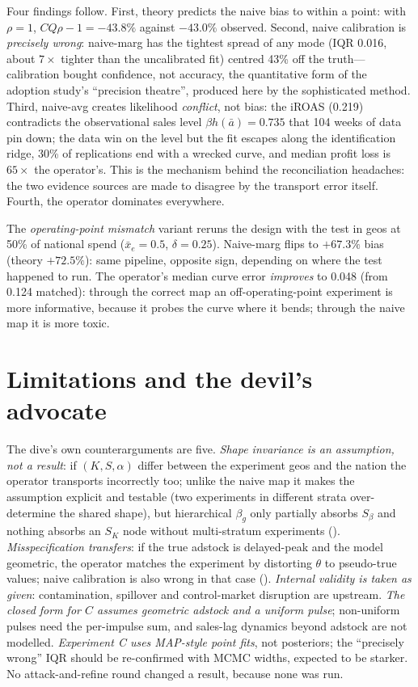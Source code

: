 Four findings follow. First, theory predicts the naive bias to within a point: with $\rho = 1$, $CQ\rho - 1 = -43.8\%$ against $-43.0\%$ observed. Second, naive calibration is \emph{precisely wrong}: naive-marg has the tightest spread of any mode (IQR 0.016, about $7\times$ tighter than the uncalibrated fit) centred 43\% off the truth---calibration bought confidence, not accuracy, the quantitative form of the adoption study's ``precision theatre'', produced here by the sophisticated method. Third, naive-avg creates likelihood \emph{conflict}, not bias: the iROAS (0.219) contradicts the observational sales level $\beta h(\bar a) = 0.735$ that 104 weeks of data pin down; the data win on the level but the fit escapes along the identification ridge, 30\% of replications end with a wrecked curve, and median profit loss is $65\times$ the operator's. This is the mechanism behind the reconciliation headaches: the two evidence sources are made to disagree by the transport error itself. Fourth, the operator dominates everywhere.

The \emph{operating-point mismatch} variant reruns the design with the test in geos at 50\% of national spend ($\bar x_e = 0.5$, $\delta = 0.25$). Naive-marg flips to $+67.3\%$ bias (theory $+72.5\%$): same pipeline, opposite sign, depending on where the test happened to run. The operator's median curve error \emph{improves} to 0.048 (from 0.124 matched): through the correct map an off-operating-point experiment is more informative, because it probes the curve where it bends; through the naive map it is more toxic.

\section{Limitations and the devil's advocate}

The dive's own counterarguments are five. \emph{Shape invariance is an assumption, not a result}: if $(K, S, \alpha)$ differ between the experiment geos and the nation the operator transports incorrectly too; unlike the naive map it makes the assumption explicit and testable (two experiments in different strata over-determine the shared shape), but hierarchical $\beta_g$ only partially absorbs $S_\beta$ and nothing absorbs an $S_K$ node without multi-stratum experiments (). \emph{Misspecification transfers}: if the true adstock is delayed-peak and the model geometric, the operator matches the experiment by distorting $\theta$ to pseudo-true values; naive calibration is also wrong in that case (). \emph{Internal validity is taken as given}: contamination, spillover and control-market disruption are upstream. \emph{The closed form for $C$ assumes geometric adstock and a uniform pulse}; non-uniform pulses need the per-impulse sum, and sales-lag dynamics beyond adstock are not modelled. \emph{Experiment C uses MAP-style point fits}, not posteriors; the ``precisely wrong'' IQR should be re-confirmed with MCMC widths, expected to be starker. No attack-and-refine round changed a result, because none was run.

